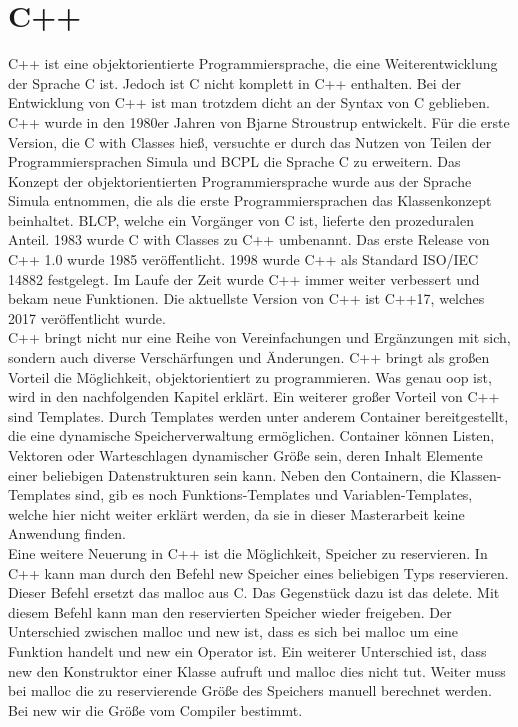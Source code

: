 \section{C++ }
C++ ist eine objektorientierte Programmiersprache, die eine Weiterentwicklung der Sprache C ist. Jedoch ist C nicht komplett in C++ enthalten. Bei der Entwicklung von C++ ist man trotzdem dicht an der Syntax von C geblieben. C++ wurde in den 1980er Jahren von Bjarne Stroustrup entwickelt. Für die erste Version, die \glqq C with Classes\grqq{} hieß, versuchte er durch das Nutzen von Teilen der Programmiersprachen Simula und BCPL die Sprache C zu erweitern. Das Konzept der objektorientierten Programmiersprache  wurde aus der Sprache Simula entnommen, die als die erste Programmiersprachen das Klassenkonzept beinhaltet.  BLCP, welche ein Vorgänger von C ist, lieferte den  prozeduralen Anteil.   1983 wurde \glqq C with Classes\grqq{} zu C++ umbenannt. Das erste Release von C++ 1.0 wurde 1985 veröffentlicht. 1998 wurde C++ als Standard \glqq ISO/IEC 14882\grqq{} festgelegt. Im Laufe der Zeit wurde C++ immer weiter verbessert und bekam neue Funktionen. Die aktuellste Version von C++ ist C++17, welches 2017 veröffentlicht wurde.\\
C++ bringt nicht nur eine Reihe von Vereinfachungen und Ergänzungen mit sich, sondern auch diverse Verschärfungen und Änderungen. 
C++ bringt als großen Vorteil die Möglichkeit, objektorientiert zu programmieren. Was genau  \acl{oop} ist, wird in den nachfolgenden Kapitel erklärt. Ein weiterer großer Vorteil von C++ sind Templates. Durch Templates werden unter anderem Container bereitgestellt, die eine dynamische Speicherverwaltung ermöglichen. Container können Listen, Vektoren oder Warteschlagen dynamischer Größe sein, deren Inhalt Elemente einer beliebigen Datenstrukturen sein kann. Neben den Containern, die Klassen-Templates  sind,  gib es noch Funktions-Templates und Variablen-Templates, welche hier nicht weiter erklärt werden, da sie in dieser Masterarbeit keine Anwendung finden. \\
Eine weitere Neuerung in C++ ist die Möglichkeit, Speicher zu reservieren. In C++ kann man durch den Befehl \glqq new\grqq{} Speicher eines beliebigen Typs reservieren. Dieser Befehl ersetzt das \glqq malloc\grqq{} aus C.  Das Gegenstück dazu ist das  \glqq delete\grqq{}. Mit diesem Befehl kann man den reservierten Speicher wieder freigeben. Der Unterschied zwischen  \glqq malloc\grqq{} und \glqq new\grqq{} ist, dass es sich bei \glqq malloc\grqq{} um eine Funktion handelt  und \glqq new\grqq{} ein Operator ist.  Ein weiterer Unterschied  ist, dass \glqq new\grqq{} den Konstruktor einer Klasse aufruft und \glqq malloc\grqq{} dies nicht tut. Weiter muss bei \glqq malloc\grqq{} die zu reservierende Größe des Speichers manuell berechnet werden. Bei  \glqq new\grqq{} wir die Größe vom Compiler bestimmt. \\
